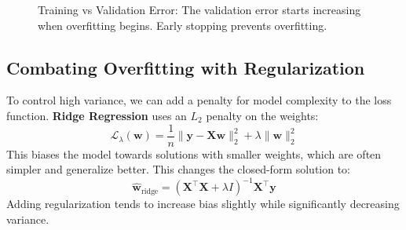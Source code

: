 \documentclass{article}
\newcommand{\w}{\mathbf{w}}
\newcommand{\x}{\mathbf{x}}
\newcommand{\y}{\mathbf{y}}
\newcommand{\X}{\mathbf{X}}
\newcommand{\loss}{\mathcal{L}}
\newcommand{\T}{^\top}
\begin{document}
\begin{figure}[h!]
\centering
{}
\caption{Training vs Validation Error: The validation error starts increasing when overfitting begins. Early stopping prevents overfitting.}
\end{figure}

\subsection{Combating Overfitting with Regularization}
To control high variance, we can add a penalty for model complexity to the loss function. \textbf{Ridge Regression} uses an $L_2$ penalty on the weights:
\begin{equation}
    \loss_\lambda(\w) = \frac{1}{n}\|\y - \X\w\|_2^2 + \lambda\|\w\|_2^2
\end{equation}
This biases the model towards solutions with smaller weights, which are often simpler and generalize better. This changes the closed-form solution to:
\begin{equation}
    \hat{\w}_{\text{ridge}} = (\X\T\X + \lambda I)^{-1}\X\T\y
\end{equation}
Adding regularization tends to increase bias slightly while significantly decreasing variance.
\end{document}

